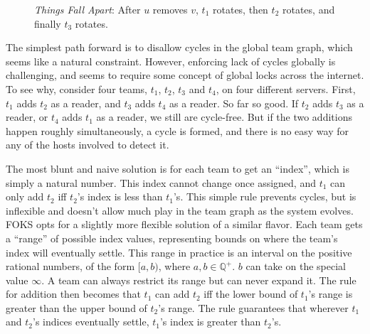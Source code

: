 \begin{figure}[ht]
    \centering
    \caption{\textit{Things Fall Apart}: After $u$ removes $v$, $t_1$ rotates, then $t_2$ rotates, and finally $t_3$ rotates.}
    \label{fig:cycle4}
\end{figure}

The simplest path forward is to disallow cycles in the global team
graph, which seems like a natural constraint. However, enforcing
lack of cycles globally is challenging, and seems to require some
concept of global locks across the internet. To see why, consider
four teams, $t_1$, $t_2$, $t_3$ and $t_4$, on four different servers.
First, $t_1$ adds $t_2$ as a reader, and $t_3$ adds $t_4$ as a reader.
So far so good. If $t_2$ adds $t_3$ as a reader, or $t_4$ adds
$t_1$ as a reader, we still are cycle-free.  But if the two additions
happen roughly simultaneously, a cycle is formed, and there is no easy
way for any of the hosts involved to detect it.

The most blunt and naive solution is for each team to get an ``index'', which
is simply a natural number. This index cannot change once assigned, and
$t_1$ can only add $t_2$ iff $t_2$'s index is less than $t_1$'s. This simple
rule prevents cycles, but is inflexible and doesn't allow much play in the team
graph as the system evolves. FOKS opts for a slightly more flexible solution of
a similar flavor. Each team gets a ``range'' of possible index values,
representing bounds on where the team's index will eventually settle.  This
range in practice is an interval on the positive rational numbers, of the form
$[a,b)$, where $a,b \in \mathbb{Q^{+}}$. $b$ can take on the special value $\infty$.
A team can always restrict its range but can never expand it. The rule for
addition then becomes that $t_1$ can add $t_2$ iff the lower bound of $t_1$'s
range is greater than the upper bound of $t_2$'s range. The rule guarantees that
wherever $t_1$ and $t_2$'s indices eventually settle, $t_1$'s index is greater
than $t_2$'s.


